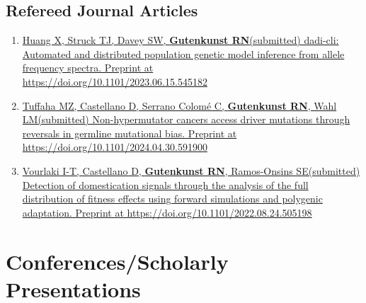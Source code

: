\documentclass[11pt]{article}
\begin{document}
\subsection*{Refereed Journal Articles}
\begin{enumerate}

\item \href{https://doi.org/10.1101/2023.06.15.545182}{Huang X\trainee\equal\corresponding, Struck TJ\trainee\equal, Davey SW, \textbf{Gutenkunst RN}\corresponding (submitted) dadi-cli: Automated and distributed population genetic model inference from allele frequency spectra. Preprint at\\https://doi.org/10.1101/2023.06.15.545182}

\item \href{https://doi.org/10.1101/2024.04.30.591900}{Tuffaha MZ, Castellano D\trainee, Serrano Colom\'e C, \textbf{Gutenkunst RN}, Wahl LM\corresponding (submitted) Non-hypermutator cancers access driver mutations through reversals in germline mutational bias. Preprint at https://doi.org/10.1101/2024.04.30.591900}

\item \href{https://doi.org/10.1101/2022.08.24.505198}{Vourlaki I-T\equal, Castellano D\trainee\equal, \textbf{Gutenkunst RN}\corresponding, Ramos-Onsins SE\corresponding (submitted) Detection of domestication signals through the analysis of the full distribution of fitness effects using forward simulations and polygenic adaptation. Preprint at https://doi.org/10.1101/2022.08.24.505198}

\end{enumerate}

\section*{Conferences/Scholarly Presentations}
\end{document}
